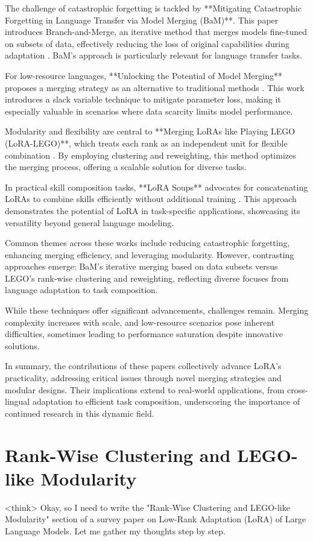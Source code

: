 \documentclass[conference]{IEEEtran}
\begin{document}
The challenge of catastrophic forgetting is tackled by **Mitigating Catastrophic Forgetting in Language Transfer via Model Merging (BaM)**. This paper introduces Branch-and-Merge, an iterative method that merges models fine-tuned on subsets of data, effectively reducing the loss of original capabilities during adaptation \cite{b2}. BaM's approach is particularly relevant for language transfer tasks.

For low-resource languages, **Unlocking the Potential of Model Merging** proposes a merging strategy as an alternative to traditional methods \cite{b3}. This work introduces a slack variable technique to mitigate parameter loss, making it especially valuable in scenarios where data scarcity limits model performance.

Modularity and flexibility are central to **Merging LoRAs like Playing LEGO (LoRA-LEGO)**, which treats each rank as an independent unit for flexible combination \cite{b4}. By employing clustering and reweighting, this method optimizes the merging process, offering a scalable solution for diverse tasks.

In practical skill composition tasks, **LoRA Soups** advocates for concatenating LoRAs to combine skills efficiently without additional training \cite{b5}. This approach demonstrates the potential of LoRA in task-specific applications, showcasing its versatility beyond general language modeling.

Common themes across these works include reducing catastrophic forgetting, enhancing merging efficiency, and leveraging modularity. However, contrasting approaches emerge: BaM's iterative merging based on data subsets versus LEGO's rank-wise clustering and reweighting, reflecting diverse focuses from language adaptation to task composition.

While these techniques offer significant advancements, challenges remain. Merging complexity increases with scale, and low-resource scenarios pose inherent difficulties, sometimes leading to performance saturation despite innovative solutions.

In summary, the contributions of these papers collectively advance LoRA's practicality, addressing critical issues through novel merging strategies and modular designs. Their implications extend to real-world applications, from cross-lingual adaptation to efficient task composition, underscoring the importance of continued research in this dynamic field.

\section{Rank-Wise Clustering and LEGO-like Modularity}
<think>
Okay, so I need to write the "Rank-Wise Clustering and LEGO-like Modularity" section of a survey paper on Low-Rank Adaptation (LoRA) of Large Language Models. Let me gather my thoughts step by step.
\end{document}
